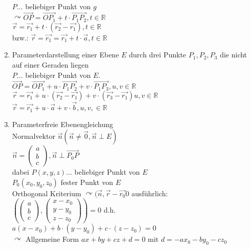 \documentclass[a4paper]{scrartcl}
\begin{document}
\begin{enumerate}
\\
$P \dots$ beliebiger Punkt von $g$\\
$\curvearrowright \overrightarrow{OP} = \overrightarrow{OP_1} + t \cdot \overrightarrow{P_1P_2}, t \in \mathbb{R}$\\
$\vec{r} = \vec{r_1} + t \cdot (\vec{r_2} - \vec{r_1}), t \in \mathbb{R}$\\
bzw.: $\vec{r} = \vec{r_1} = \vec{r_1} + t \cdot \vec{a}, t \in \mathbb{R}$
\item Parameterdarstellung einer Ebene $E$ durch drei Punkte $P_1, P_2, P_3$ die nicht auf einer Geraden liegen\\
$P \dots$ beliebiger Punkt von $E$.\\
$\overrightarrow{OP} = \overrightarrow{OP_1} + u \cdot \overrightarrow{P_1P_2} + v \cdot \overrightarrow{P_1P_3}, u,v \in \mathbb{R}$\\
$\vec{r} = \vec{r_1} + u \cdot (\vec{r_2} - \vec{r_1}) + v \cdot (\vec{r_3} - \vec{r_1} ) u,v \in \mathbb{R}$\\
$\vec{r} = \vec{r_1} + u \cdot \vec{a} + v \cdot \vec{b}, u,v, \in \mathbb{R}$
\item Parameterfreie Ebenengleichung\\
Normalvektor $\vec{n} (\vec{n} \neq \vec{0}, \vec{n} \perp E)$\\
$\vec{n} = \begin{pmatrix} a \\ b \\ c \end{pmatrix}, \vec{n} \perp \overrightarrow{P_0P}$\\
dabei $P(x,y,z) \dots$ beliebiger Punkt von $E$\\
$P_0 (x_0,y_0,z_0)$ fester Punkt von $E$\\
Orthogonal Kriterium $\curvearrowright (\vec{n}, \vec{r} - \vec{r_0} 0$ ausführlich:\\
$( \begin{pmatrix} a\\b\\c \end{pmatrix}, \begin{pmatrix} x-x_0\\ y - y_0 \\ z - z_0 \end{pmatrix}) = 0$ d.h. $a(x-x_0) + b\cdot (y-y_0) + c \cdot (z-z_0) = 0$\\
$\curvearrowright$ Allgemeine Form $ax+by+cz+d=0 \text{ mit } d= -ax_0 -by_0 -cz_0$
\end{enumerate}
\end{document}
